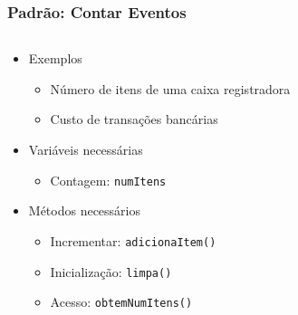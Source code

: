 \documentclass[xcolor={dvipsnames,table},aspectratio=169]{beamer}
\begin{document}
\begin{frame}[fragile]\frametitle{Padrão: Contar Eventos}
\begin{columns}[T]
	\begin{column}{0.5\linewidth}
\begin{itemize}
	\item Exemplos
	\begin{itemize}
		\item Número de itens de uma caixa registradora
		\item Custo de transações bancárias
	\end{itemize}
	\item Variáveis necessárias
	\begin{itemize}
		\item Contagem: \texttt{numItens}
	\end{itemize}
	\item Métodos necessários
	\begin{itemize}
		\item Incrementar: \texttt{adicionaItem()}
		\item Inicialização: \texttt{limpa()}
		\item Acesso: \texttt{obtemNumItens()}
	\end{itemize}
\end{itemize}
	\end{column}
	\begin{column}{0.5\linewidth}
{\tiny\inputminted[bgcolor=cyan!10]{java}{src/caixa1/CaixaRegistradora.java}}
	\end{column}
\end{columns}
\end{frame}
\end{document}

